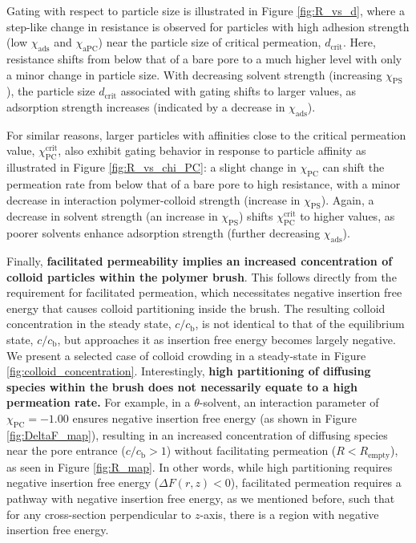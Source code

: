 \documentclass[12pt, a4paper]{article}
\begin{document}
Gating with respect to particle size is illustrated in Figure \ref{fig:R_vs_d}, where a step-like change in resistance is observed for particles with high adhesion strength (low $\chi_{\text{ads}}$ and $\chi_{\text{aPC}}$) near the particle size of critical permeation, $d_{\text{crit}}$.
Here, resistance shifts from below that of a bare pore to a much higher level with only a minor change in particle size.
With decreasing solvent strength (increasing $\chi_{\text{PS}}$), the particle size $d_{\text{crit}}$ associated with gating shifts to larger values, as adsorption strength increases (indicated by a decrease in $\chi_{\text{ads}}$).

For similar reasons, larger particles with affinities close to the critical permeation value, $\chi^{\text{crit}}_{\text{PC}}$, also exhibit gating behavior in response to particle affinity as illustrated in Figure \ref{fig:R_vs_chi_PC}: a slight change in $\chi_{\text{PC}}$ can shift the permeation rate from below that of a bare pore to high resistance, with a minor decrease in interaction polymer-colloid strength (increase in $\chi_{\text{PS}}$).
Again, a decrease in solvent strength (an increase in $\chi_{\text{PS}}$) shifts $\chi^{\text{crit}}_{\text{PC}}$ to higher values, as poorer solvents enhance adsorption strength (further decreasing $\chi_{\text{ads}}$).

Finally, \textbf{facilitated permeability implies an increased concentration of colloid particles within the polymer brush}.
This follows directly from the requirement for facilitated permeation, which necessitates negative insertion free energy that causes colloid partitioning inside the brush.
The resulting colloid concentration in the steady state, $c/c_{\text{b}}$, is not identical to that of the equilibrium state, $c/c_{\text{b}}$, but approaches it as insertion free energy becomes largely negative.
We present a selected case of colloid crowding in a steady-state in Figure \ref{fig:colloid_concentration}.
Interestingly, \textbf{high partitioning of diffusing species within the brush does not necessarily equate to a high permeation rate.}
For example, in a $\theta$-solvent, an interaction parameter of $\chi_{\text{PC}} = -1.00$ ensures negative insertion free energy (as shown in Figure \ref{fig:DeltaF_map}), resulting in an increased concentration of diffusing species near the pore entrance ($c/c_{\text{b}} > 1$) without facilitating permeation ($R < R_{\text{empty}}$), as seen in Figure \ref{fig:R_map}.
In other words, while high partitioning requires negative insertion free energy ($\Delta F(r,z) < 0$), facilitated permeation requires a pathway with negative insertion free energy, as we mentioned before, such that for any cross-section perpendicular to $z$-axis, there is a region with negative insertion free energy.
\end{document}
